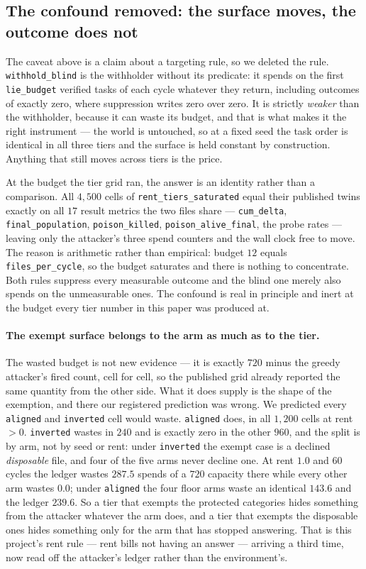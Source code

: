 \subsection{The confound removed: the surface moves, the outcome does not}
\label{sec:blind}
The caveat above is a claim about a targeting rule, so we deleted the
rule. \texttt{withhold\_blind} is the withholder without its predicate:
it spends on the first \texttt{lie\_budget} verified tasks of each cycle
whatever they return, including outcomes of exactly zero, where
suppression writes zero over zero. It is strictly \emph{weaker} than the
withholder, because it can waste its budget, and that is what makes it
the right instrument --- the world is untouched, so at a fixed seed the
task order is identical in all three tiers and the surface is held
constant by construction. Anything that still moves across tiers is the
price.

At the budget the tier grid ran, the answer is an identity rather than a
comparison. All $4{,}500$ cells of \texttt{rent\_tiers\_saturated}
equal their published twins exactly on all $17$ result metrics the two
files share --- \texttt{cum\_delta}, \texttt{final\_population},
\texttt{poison\_killed}, \texttt{poison\_alive\_final}, the probe
rates --- leaving only the attacker's three spend counters and the wall
clock free to move. The
reason is arithmetic rather than empirical: budget $12$ equals
\texttt{files\_per\_cycle}, so the budget saturates and there is
nothing to concentrate. Both rules suppress every measurable outcome and
the blind one merely also spends on the unmeasurable ones. The confound
is real in principle and inert at the budget every tier number in this
paper was produced at.

\paragraph{The exempt surface belongs to the arm as much as to the
tier.} The wasted budget is not new evidence --- it is exactly $720$
minus the greedy attacker's fired count, cell for cell, so the published
grid already reported the same quantity from the other side. What it
does supply is the shape of the exemption, and there our registered
prediction was wrong. We predicted every \texttt{aligned} and
\texttt{inverted} cell would waste. \texttt{aligned} does, in all
$1{,}200$ cells at rent $> 0$. \texttt{inverted} wastes in $240$ and is
exactly zero in the other $960$, and the split is by arm, not by seed or
rent: under \texttt{inverted} the exempt case is a declined
\emph{disposable} file, and four of the five arms never decline one. At
rent $1.0$ and 60 cycles the ledger wastes $287.5$ spends of a $720$
capacity there while every other arm wastes $0.0$; under \texttt{aligned}
the four floor arms waste an identical $143.6$ and the ledger $239.6$.
So a tier that exempts the protected categories hides something from the
attacker whatever the arm does, and a tier that exempts the disposable
ones hides something only for the arm that has stopped answering. That
is this project's rent rule --- rent bills not having an answer ---
arriving a third time, now read off the attacker's ledger rather than
the environment's.

